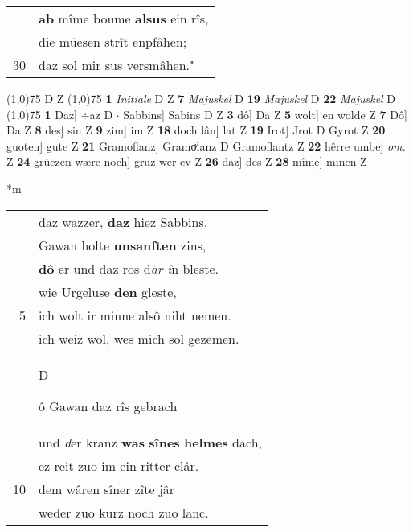 \documentclass[8pt,a4paper,notitlepage]{article}
\begin{document}
\begin{table}[ht]
\begin{minipage}[t]{0.5\linewidth}
\begin{tabular}{rl}
 & \textbf{ab} mîme boume \textbf{alsus} ein rîs,\\ 
 & die müesen strît enpfâhen;\\ 
30 & daz sol mir sus versmâhen."\\ 
\end{tabular}
\scriptsize
\line(1,0){75} \newline
D Z \newline
\line(1,0){75} \newline
\textbf{1} \textit{Initiale} D Z  \textbf{7} \textit{Majuskel} D  \textbf{19} \textit{Majuskel} D  \textbf{22} \textit{Majuskel} D  \newline
\line(1,0){75} \newline
\textbf{1} Daz] ÷az D  $\cdot$ Sabbins] Sabins D Z \textbf{3} dô] Da Z \textbf{5} wolt] en wolde Z \textbf{7} Dô] Da Z \textbf{8} des] sin Z \textbf{9} zim] im Z \textbf{18} doch lân] lat Z \textbf{19} Irot] Jrot D Gyrot Z \textbf{20} guoten] gute Z \textbf{21} Gramoflanz] Gramoͮlanz D Gramoflantz Z \textbf{22} hêrre umbe] \textit{om.} Z \textbf{24} grüezen wære noch] gruz wer ev Z \textbf{26} daz] des Z \textbf{28} mîme] minen Z \newline
\end{minipage}
\hspace{0.5cm}
\begin{minipage}[t]{0.5\linewidth}
\small
\begin{center}*m
\end{center}
\begin{tabular}{rl}
 & daz wazzer, \textbf{daz} hiez Sabbins.\\ 
 & Gawan holte \textbf{unsanften} zins,\\ 
 & \textbf{dô} er und daz ros d\textit{ar î}n bleste.\\ 
 & wie Urgeluse \textbf{den} gleste,\\ 
5 & ich wolt ir minne alsô niht nemen.\\ 
 & ich weiz wol, wes mich sol gezemen.\\ 
 & \begin{large}D\end{large}ô Gawan daz rîs gebrach\\ 
 & und \textit{d}er kranz \textbf{was} \textbf{sînes} \textbf{helmes} dach,\\ 
 & ez reit zuo im ein ritter clâr.\\ 
10 & dem wâren sîner zîte jâr\\ 
 & weder zuo kurz noch zuo lanc.\\ 

\end{tabular}
\end{minipage}
\end{table}
\end{document}
